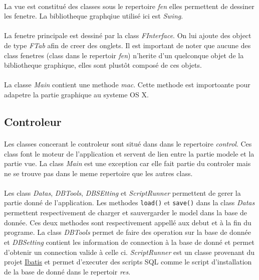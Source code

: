 \documentclass[a4paper,10pt]{report}
\begin{document}
			\paragraph*{}
			La vue est constitué des classes sous le repertoire \textit{fen} elles permettent de dessiner les fenetre. La bibliotheque graphqiue utilisé ici est \textit{Swing}.

			\paragraph*{}
			La fenetre principale est dessiné par la class \textit{FInterface}. On lui ajoute des object de type \textit{FTab} afin de creer des onglets. Il est important de noter que aucune des class fenetres (class dans le repertoir \textit{fen}) n'herite d'un quelconque objet de la bibliotheque graphique, elles sont plustôt composé de ces objets.

			\paragraph*{}
			La classe \textit{Main} contient une methode \textit{mac}. Cette methode est importoante pour adapetre la partie graphique au systeme OS X.

		\subsection{Controleur}

			\paragraph*{}
			Les classes concerant le controleur sont situé dans dans le repertoire \textit{control}. Ces class font le moteur de l'application et servent de lien entre la partie modele et la partie vue. La class \textit{Main} est une exception car elle fait partie du controler mais ne se trouve pas dans le meme repertoire que les autres class.

			\paragraph*{}
			Les class \textit{Datas}, \textit{DBTools}, \textit{DBSEtting} et \textit{ScriptRunner} permettent de gerer la partie donné de l'application. 
			Les methodes \texttt{load()} et \texttt{save()} dans la class \textit{Datas} permettent respectivement de charger et sauvergarder le model dans la base de donnée. Ces deux methodes sont respectivement appellé aux debut et à la fin du programe.
			La class \textit{DBTools} permet de faire des operation sur la base de donnée et \textit{DBSetting} contient les information de connection à la base de donné et permet d'obtenir un connection valide à celle ci.
			\textit{ScriptRunner} est un classe provenant du projet \href{http://ibatis.apache.org/}{Ibatis} et permet d'executer des scripts SQL comme le script d'installation de la base de donné dans le repertoir \textit{res}. 
\end{document}
